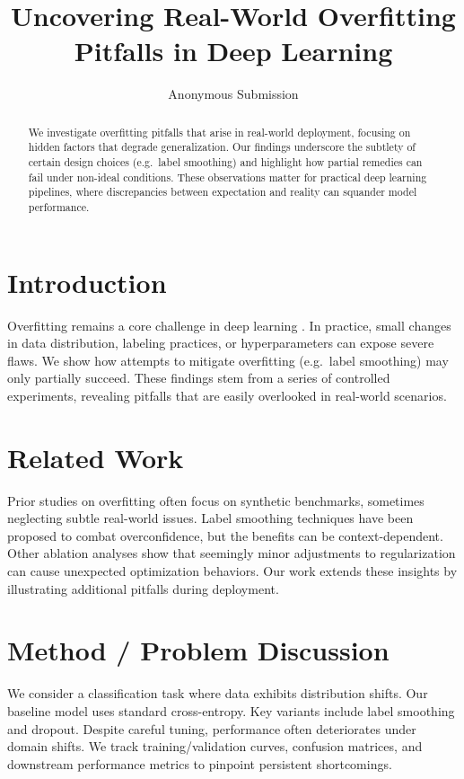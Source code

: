 \documentclass{article}
\title{Uncovering Real-World Overfitting Pitfalls in Deep Learning}
\author{Anonymous Submission}
\date{}
\begin{document}
\maketitle

\begin{abstract}
We investigate overfitting pitfalls that arise in real-world deployment, focusing on hidden factors that degrade generalization. Our findings underscore the subtlety of certain design choices (e.g.\ label smoothing) and highlight how partial remedies can fail under non-ideal conditions. These observations matter for practical deep learning pipelines, where discrepancies between expectation and reality can squander model performance.
\end{abstract}

\section{Introduction}
Overfitting remains a core challenge in deep learning \cite{smith2020pitfalls}. In practice, small changes in data distribution, labeling practices, or hyperparameters can expose severe flaws. We show how attempts to mitigate overfitting (e.g.\ label smoothing) may only partially succeed. These findings stem from a series of controlled experiments, revealing pitfalls that are easily overlooked in real-world scenarios.

\section{Related Work}
Prior studies on overfitting \cite{smith2020pitfalls} often focus on synthetic benchmarks, sometimes neglecting subtle real-world issues. Label smoothing techniques \cite{lee2021label} have been proposed to combat overconfidence, but the benefits can be context-dependent. Other ablation analyses \cite{kim2023curves} show that seemingly minor adjustments to regularization can cause unexpected optimization behaviors. Our work extends these insights by illustrating additional pitfalls during deployment.

\section{Method / Problem Discussion}
We consider a classification task where data exhibits distribution shifts. Our baseline model uses standard cross-entropy. Key variants include label smoothing and dropout. Despite careful tuning, performance often deteriorates under domain shifts. We track training/validation curves, confusion matrices, and downstream performance metrics to pinpoint persistent shortcomings.
\end{document}
